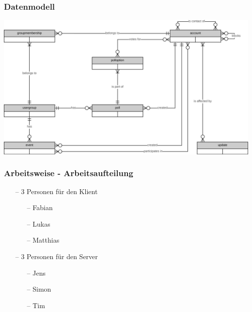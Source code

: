 \documentclass[aspectratio=1610]{beamer}
\begin{document}

  \begin{frame}[plain]
      \frametitle{\textbf{Datenmodell}}
      \includegraphics[width = \columnwidth - 30pt]
        {images/erd.png}
  \end{frame}


  \begin{frame}[plain]
      \frametitle{\textbf{Arbeitsweise - Arbeitsaufteilung}}
      \begin{itemize}
          \setlength\itemsep{0.3em}
          \item[--] 3 Personen für den Klient
              \begin{itemize}
                  \item[--] Fabian
                  \item[--] Lukas
                  \item[--] Matthias
              \end{itemize}
          \item[--] 3 Personen für den Server
              \begin{itemize}
                  \item[--] Jens
                  \item[--] Simon
                  \item[--] Tim
              \end{itemize}
      \end{itemize}
  \end{frame}
\end{document}
